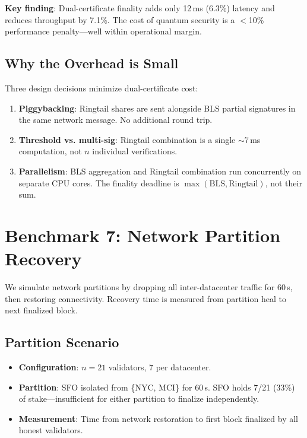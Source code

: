 \documentclass[11pt]{article}
\begin{document}
\textbf{Key finding}: Dual-certificate finality adds only 12\,ms (6.3\%) latency and
reduces throughput by 7.1\%. The cost of quantum security is a $<$10\% performance
penalty---well within operational margin.

\subsection{Why the Overhead is Small}

Three design decisions minimize dual-certificate cost:

\begin{enumerate}
\item \textbf{Piggybacking}: Ringtail shares are sent alongside BLS partial signatures
      in the same network message. No additional round trip.
\item \textbf{Threshold vs. multi-sig}: Ringtail combination is a single $\sim$7\,ms
      computation, not $n$ individual verifications.
\item \textbf{Parallelism}: BLS aggregation and Ringtail combination run concurrently
      on separate CPU cores. The finality deadline is
      $\max(\text{BLS}, \text{Ringtail})$, not their sum.
\end{enumerate}

\section{Benchmark 7: Network Partition Recovery}
\label{sec:partition}

We simulate network partitions by dropping all inter-datacenter traffic for 60\,s, then
restoring connectivity. Recovery time is measured from partition heal to next finalized
block.

\subsection{Partition Scenario}

\begin{itemize}
\item \textbf{Configuration}: $n=21$ validators, 7 per datacenter.
\item \textbf{Partition}: SFO isolated from \{NYC, MCI\} for 60\,s. SFO holds 7/21
      (33\%) of stake---insufficient for either partition to finalize independently.
\item \textbf{Measurement}: Time from network restoration to first block finalized by
      all honest validators.
\end{itemize}
\end{document}
